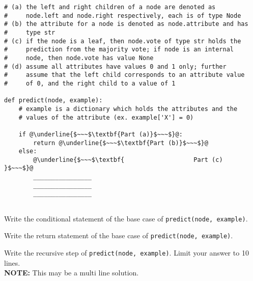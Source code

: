 \documentclass[11pt,addpoints,answers]{exam}
\begin{document}
\begin{questions}
\begin{parts}
\begin{lstlisting}[escapechar=@]
# (a) the left and right children of a node are denoted as
#     node.left and node.right respectively, each is of type Node
# (b) the attribute for a node is denoted as node.attribute and has
#     type str
# (c) if the node is a leaf, then node.vote of type str holds the 
#     prediction from the majority vote; if node is an internal
#     node, then node.vote has value None
# (d) assume all attributes have values 0 and 1 only; further
#     assume that the left child corresponds to an attribute value
#     of 0, and the right child to a value of 1

def predict(node, example):
    # example is a dictionary which holds the attributes and the
    # values of the attribute (ex. example['X'] = 0)
    
    if @\underline{$~~~$\textbf{Part (a)}$~~~$}@:
        return @\underline{$~~~$\textbf{Part (b)}$~~~$}@
    else:   
        @\underline{$~~~$\textbf{                   Part (c)          }$~~~$}@
        ________________
        ________________
        ________________
    

    \end{lstlisting}
    \begin{subparts}
    \subpart[2] Write the conditional statement of the base case of \texttt{predict(node, example)}. \\
    \begin{your_solution}[title=Your Answer,height=3.05cm]
        
    \begin{your_code_solution}
    \end{your_code_solution}
        
        
    \end{your_solution}

    \subpart[1] Write the return statement of the base case of \texttt{predict(node, example)}. \\

    \begin{your_solution}[title=Your Answer,height=3.05cm]
        
    \begin{your_code_solution}
    \end{your_code_solution}
        
        
    \end{your_solution}
    
    \subpart[3] Write the recursive step of \texttt{predict(node, example)}. Limit your answer to 10 lines.\\
    \textbf{NOTE:} This may be a multi line solution.  \\
    \begin{your_solution}[title=Your Answer,height=7.05cm]
        

\end{your_solution}
\end{subparts}
\end{parts}
\end{questions}
\end{document}
